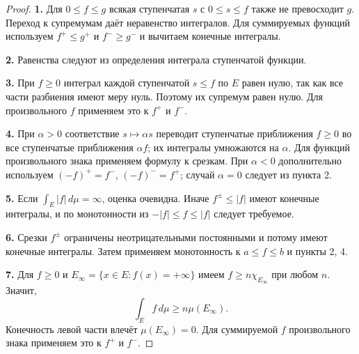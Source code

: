 \begin{proof}
\textbf{1.} Для $0\le f\le g$ всякая ступенчатая $s$ с $0\le s\le f$ также не превосходит $g$.
Переход к супремумам даёт неравенство интегралов.
Для суммируемых функций используем $f^+\le g^+$ и $f^-\ge g^-$ и вычитаем конечные интегралы.

\textbf{2.} Равенства следуют из определения интеграла ступенчатой функции.

\textbf{3.} При $f\ge0$ интеграл каждой ступенчатой $s\le f$ по $E$ равен нулю, так как все части разбиения имеют меру нуль.
Поэтому их супремум равен нулю.
Для произвольного $f$ применяем это к $f^+$ и $f^-$.

\textbf{4.} При $\alpha>0$ соответствие $s\mapsto\alpha s$ переводит ступенчатые приближения $f\ge0$ во все ступенчатые приближения $\alpha f$; их интегралы умножаются на $\alpha$.
Для функций произвольного знака применяем формулу к срезкам.
При $\alpha<0$ дополнительно используем $(-f)^+=f^-$, $(-f)^-=f^+$; случай $\alpha=0$ следует из пункта 2.

\textbf{5.} Если $\int_E|f|\,d\mu=\infty$, оценка очевидна.
Иначе $f^\pm\le|f|$ имеют конечные интегралы, и по монотонности из $-|f|\le f\le|f|$ следует требуемое.

\textbf{6.} Срезки $f^\pm$ ограничены неотрицательными постоянными и потому имеют конечные интегралы.
Затем применяем монотонность к $a\le f\le b$ и пункты 2, 4.

\textbf{7.} Для $f\ge0$ и $E_\infty=\{x\in E:f(x)=+\infty\}$ имеем $f\ge n\chi_{E_\infty}$ при любом $n$.
Значит,
\[
  \int_E f\,d\mu\ge n\mu(E_\infty).
\]
Конечность левой части влечёт $\mu(E_\infty)=0$.
Для суммируемой $f$ произвольного знака применяем это к $f^+$ и $f^-$.
\end{proof}
